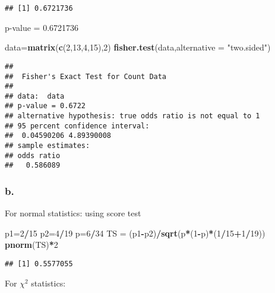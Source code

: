 \documentclass[]{article}
\newenvironment{Shaded}{\begin{snugshade}}{\end{snugshade}}
\newcommand{\KeywordTok}[1]{\textcolor[rgb]{0.13,0.29,0.53}{\textbf{#1}}}
\newcommand{\DataTypeTok}[1]{\textcolor[rgb]{0.13,0.29,0.53}{#1}}
\newcommand{\DecValTok}[1]{\textcolor[rgb]{0.00,0.00,0.81}{#1}}
\newcommand{\StringTok}[1]{\textcolor[rgb]{0.31,0.60,0.02}{#1}}
\newcommand{\OperatorTok}[1]{\textcolor[rgb]{0.81,0.36,0.00}{\textbf{#1}}}
\newcommand{\NormalTok}[1]{#1}
\begin{document}
\begin{verbatim}
## [1] 0.6721736
\end{verbatim}

p-value = 0.6721736

\begin{Shaded}
\begin{Highlighting}[]
\NormalTok{data=}\KeywordTok{matrix}\NormalTok{(}\KeywordTok{c}\NormalTok{(}\DecValTok{2}\NormalTok{,}\DecValTok{13}\NormalTok{,}\DecValTok{4}\NormalTok{,}\DecValTok{15}\NormalTok{),}\DecValTok{2}\NormalTok{)}
\KeywordTok{fisher.test}\NormalTok{(data,}\DataTypeTok{alternative =} \StringTok{"two.sided"}\NormalTok{)}
\end{Highlighting}
\end{Shaded}

\begin{verbatim}
## 
##  Fisher's Exact Test for Count Data
## 
## data:  data
## p-value = 0.6722
## alternative hypothesis: true odds ratio is not equal to 1
## 95 percent confidence interval:
##  0.04590206 4.89390008
## sample estimates:
## odds ratio 
##   0.586089
\end{verbatim}

\subsubsection{b.}\label{b.-1}

For normal statistics: using score test

\begin{Shaded}
\begin{Highlighting}[]
\NormalTok{p1=}\DecValTok{2}\OperatorTok{/}\DecValTok{15}
\NormalTok{p2=}\DecValTok{4}\OperatorTok{/}\DecValTok{19}
\NormalTok{p=}\DecValTok{6}\OperatorTok{/}\DecValTok{34}
\NormalTok{TS =}\StringTok{ }\NormalTok{(p1}\OperatorTok{-}\NormalTok{p2)}\OperatorTok{/}\KeywordTok{sqrt}\NormalTok{(p}\OperatorTok{*}\NormalTok{(}\DecValTok{1}\OperatorTok{-}\NormalTok{p)}\OperatorTok{*}\NormalTok{(}\DecValTok{1}\OperatorTok{/}\DecValTok{15}\OperatorTok{+}\DecValTok{1}\OperatorTok{/}\DecValTok{19}\NormalTok{))}
\KeywordTok{pnorm}\NormalTok{(TS)}\OperatorTok{*}\DecValTok{2}
\end{Highlighting}
\end{Shaded}

\begin{verbatim}
## [1] 0.5577055
\end{verbatim}

For \(\chi^2\) statistics:
\end{document}
